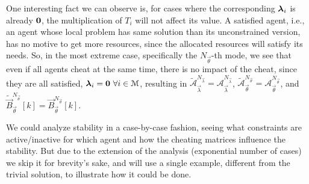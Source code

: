 \documentclass[../main.tex]{subfiles}
\begin{document}
\begin{remark}\label{rem:cheat_satisfied_problem}
  One interesting fact we can observe is, for cases where the corresponding $\boldsymbol{\lambda}_i$ is already $\mathbf{0}$, the multiplication of $T_{i}$ will not affect its value.
  A satisfied agent, i.e., an agent whose local problem has same solution than its unconstrained version, has no motive to get more resources, since the allocated resources will satisfy its needs.
  So, in the most extreme case, specifically the $N_{\vec{\theta}}$-th mode, we see that
  even if all agents cheat at the same time, there is no impact of the cheat, since they are all satisfied, $\boldsymbol{\lambda}_i=\mathbf{0}\ \forall i \in \mathcal{M}$, resulting in
  $\tilde{\mathcal{A}}_{\vec{\lambda}}^{N_{\vec{\lambda}}}=\mathcal{A}_{\vec{\lambda}}^{N_{\vec{\lambda}}}$,
  $\tilde{\mathcal{A}}_{\vec{\theta}}^{N_{\vec{\theta}}}=\mathcal{A}_{\vec{\theta}}^{N_{\vec{\theta}}}$, and
  $\tilde{\vec{B}}_{\vec{\theta}}^{N_{\vec{\theta}}}[k]=\vec{B}_{\vec{\theta}}^{N_{\vec{\theta}}}[k]$.
\end{remark}

We could analyze stability in a case-by-case fashion, seeing what constraints are active/inactive for which agent and how the cheating matrices influence the stability.
But due to the extension of the analysis (exponential number of cases) we skip it for brevity's sake, and will use a single example, different from the trivial solution, to illustrate how it could be done.
\end{document}
